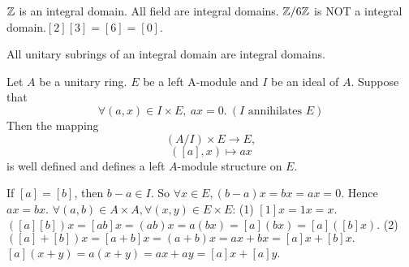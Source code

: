 \documentclass{book}
\numberwithin{equation}{section}
\begin{document}
\begin{exampleenv}
    \quad \newline
    $\mathbb{Z}$ is an integral domain.
    \newline
     All field are integral domains.
     \newline
      $\mathbb{Z}/6\mathbb{Z}$ is NOT a integral domain.$[2][3]=[6]=[0].$
\end{exampleenv}
\begin{propositionenv}
    All unitary subrings of an integral domain are integral domains.
\end{propositionenv}
\begin{propositionenv}
    Let $A$ be a unitary ring. $E$ be a left A-module and $I$ be an ideal of $A$. Suppose that 
    $$\forall (a,x)\in I\times E,\ ax=0.\ (I\text{ annihilates }E)$$
    Then the mapping
    $$\left(A/I\right)\times E\longrightarrow E,$$
    $$\left([a],x\right)\longmapsto ax$$
    is well defined and defines a left $A$-module structure on $E$.
\end{propositionenv}
\begin{proofenv}
    If $[a]=[b]$, then $b-a\in I$. So $\forall x\in E, (b-a)x=bx=ax=0$. Hence $ax=bx$. $\forall (a,b)\in A\times A,\forall (x,y)\in E\times E$:
    \newline
    (1) $[1]x=1x=x.$ $\left([a][b]\right)x=[ab]x=(ab)x=a(bx)=[a](bx)=[a]([b]x)$.
    \newline
    (2) $\left([a]+[b]\right)x=[a+b]x=(a+b)x=ax+bx=[a]x+[b]x.$ $[a](x+y)=a(x+y)=ax+ay=[a]x+[a]y$.
\end{proofenv}
\end{document}
